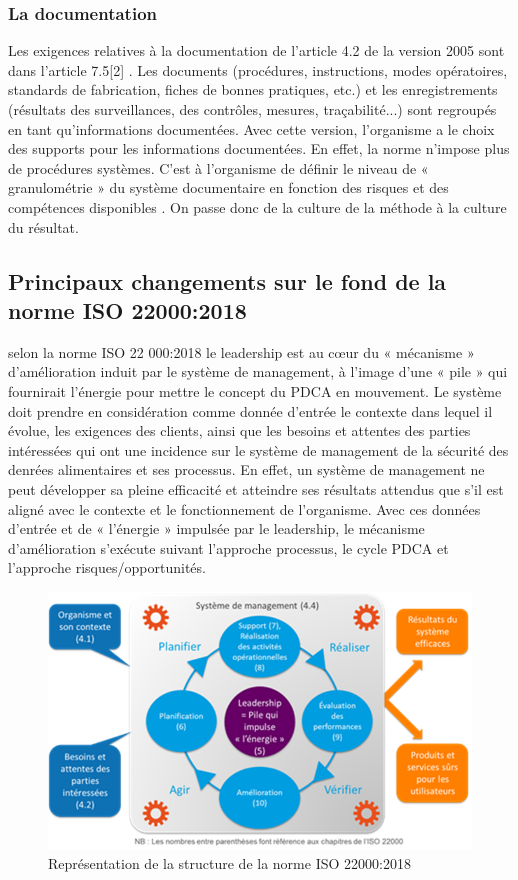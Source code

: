 \begin{spacing}{1.2}
\subsubsection{ La documentation }
Les exigences relatives à la documentation de l’article 4.2 de la version 2005 sont dans l’article 7.5[2] . Les documents (procédures, instructions, modes opératoires, standards de fabrication, fiches de bonnes pratiques, etc.) et les enregistrements (résultats des surveillances, des contrôles, mesures, traçabilité...) sont regroupés en tant qu’informations documentées. Avec cette version, l’organisme a le choix des supports pour les informations documentées. En effet, la norme n’impose plus de procédures systèmes. C’est à l’organisme de définir le niveau de « granulométrie » du système documentaire en fonction des risques et des compétences disponibles . On passe donc de la culture de la méthode à la culture du résultat.
\subsection{ Principaux changements sur le fond de la norme ISO 22000:2018 }

selon la norme ISO 22 000:2018  le leadership est au cœur  du  « mécanisme » d’amélioration induit par le système de management, à l’image d’une « pile » qui fournirait l’énergie pour mettre le concept du PDCA en mouvement.
Le système doit prendre en considération comme donnée d’entrée le contexte dans lequel il évolue, les exigences des clients, ainsi que les besoins et attentes des parties intéressées qui ont une incidence sur le système de management de la sécurité des denrées alimentaires et ses processus. En effet, un système de management ne peut développer sa pleine efficacité et atteindre ses résultats attendus que s’il est aligné avec le contexte et le fonctionnement de l’organisme.
Avec ces données d’entrée et de « l’énergie » impulsée par le leadership, le mécanisme d’amélioration s’exécute suivant l’approche processus, le cycle PDCA et l’approche risques/opportunités.


\begin{figure}[!ht]\centering
\includegraphics[scale=0.9]{image4.png}
\caption{ Représentation de la structure de la norme ISO 22000:2018 }
\label{fig:fig1}
\end{figure}


\end{spacing}
